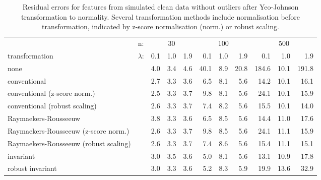 \documentclass[
  a4paper,
]{article}
\begin{document}
\begin{table}
\begin{center}
\caption{Residual errors for features from simulated clean data without outliers after Yeo-Johnson transformation to normality.
Several transformation methods include normalisation before transformation, indicated by z-score normalisation (norm.) or robust scaling.}
\label{tab:clean-transformation-residuals-appendix}
\small{
\begin{tabular}{l | l r r r r r r r r r}

\toprule
& n: & \multicolumn{3}{c}{30} & \multicolumn{3}{c}{100} & \multicolumn{3}{c}{500} \\
transformation & $\lambda$: & 0.1 & 1.0 & 1.9 & 0.1 & 1.0 & 1.9 & 0.1 & 1.0 & 1.9 \\

\midrule

none                                  & & 4.0 & 3.4 & 4.6 & 40.1 & 8.9 & 20.8 & 184.6 & 10.1 & 191.8 \\
conventional                          & & 2.7 & 3.3 & 3.6 &  6.5 & 8.1 &  5.6 &  14.2 & 10.1 &  16.1 \\
conventional (z-score norm.)          & & 2.5 & 3.3 & 3.7 &  9.8 & 8.1 &  5.6 &  24.1 & 10.1 &  15.9 \\
conventional (robust scaling)         & & 2.6 & 3.3 & 3.7 &  7.4 & 8.2 &  5.6 &  15.5 & 10.1 &  14.0 \\
Raymaekers-Rousseeuw                  & & 3.8 & 3.3 & 3.6 &  6.5 & 8.5 &  5.6 &  14.4 & 11.0 &  17.6 \\
Raymaekers-Rousseeuw (z-score norm.)  & & 2.6 & 3.3 & 3.7 &  9.8 & 8.5 &  5.6 &  24.1 & 11.1 &  15.9 \\
Raymaekers-Rousseeuw (robust scaling) & & 2.6 & 3.3 & 3.7 &  7.4 & 8.6 &  5.6 &  15.4 & 11.1 &  15.1 \\
invariant                             & & 3.0 & 3.5 & 3.6 &  5.0 & 8.1 &  5.6 &  13.1 & 10.9 &  17.8 \\
robust invariant                      & & 3.0 & 3.3 & 3.6 &  5.2 & 8.3 &  5.9 &  19.9 & 13.6 &  32.9 \\
\bottomrule
\end{tabular}
}
\end{center}
\end{table}
\end{document}
